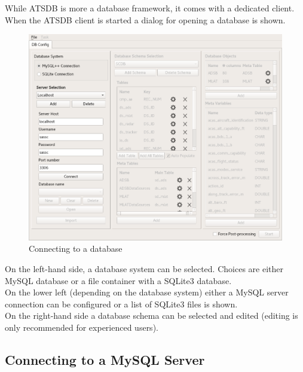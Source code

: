 \documentclass[10pt,letterpaper,extrafontsizes]{memoir}
\begin{document}
While ATSDB is more a database framework, it comes with a dedicated client. When the ATSDB client is started a dialog  for opening a database is shown. 

\begin{figure}[H]
  \hspace*{-2cm}
    \includegraphics[width=18cm,frame]{../screenshots/db_config_connect.png}
  \caption{Connecting to a database}
  \label{fig:db_connect}
\end{figure}

On the left-hand side, a database system can be selected.  Choices are either MySQL database or a file container with a SQLite3 database. \\
On the lower left (depending on the database system) either a MySQL server connection can be configured or a list of SQLite3 files is shown.\\

On the right-hand side a database schema can be selected and edited (editing is only recommended for experienced users).

\subsection{Connecting to a MySQL Server}
\end{document}
